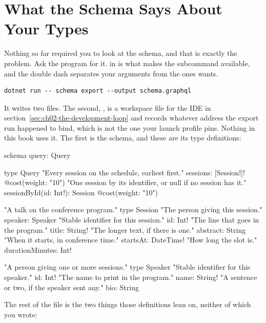 \section{What the Schema Says About Your Types}
\label{sec:ch02-what-the-schema-says-about-your-types}

%
Nothing so far required you to look at the schema, and that is exactly the
problem. Ask the program for it.  in
 is what makes the subcommand available, and the double dash
separates your arguments from the ones  wants.

\begin{verbatim}
dotnet run -- schema export --output schema.graphql
\end{verbatim}

It writes two files. The second, , is a workspace
file for the IDE in section~\ref{sec:ch02-the-development-loop} and records
whatever address the export run happened to bind, which is not the one your
launch profile pins. Nothing in this book uses it. The first is the schema, and
these are its type definitions:

\begin{graphqlsdl}
schema {
  query: Query
}

type Query {
  "Every session on the schedule, earliest first."
  sessions: [Session!]! @cost(weight: "10")
  "One session by its identifier, or null if no session has it."
  sessionById(id: Int!): Session @cost(weight: "10")
}

"A talk on the conference program."
type Session {
  "The person giving this session."
  speaker: Speaker
  "Stable identifier for this session."
  id: Int!
  "The line that goes in the program."
  title: String!
  "The longer text, if there is one."
  abstract: String
  "When it starts, in conference time."
  startsAt: DateTime!
  "How long the slot is."
  durationMinutes: Int!
}

"A person giving one or more sessions."
type Speaker {
  "Stable identifier for this speaker."
  id: Int!
  "The name to print in the program."
  name: String!
  "A sentence or two, if the speaker sent any."
  bio: String
}
\end{graphqlsdl}

The rest of the file is the two things those definitions lean on, neither of
which you wrote:

